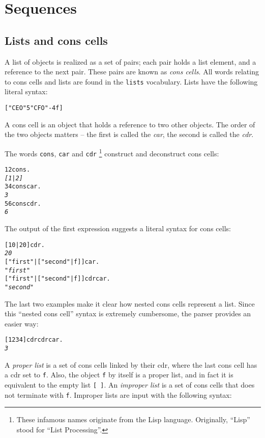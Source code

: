 \documentclass[english]{article}
\begin{document}
\section{Sequences}

\subsection{Lists and cons cells}

A list of objects is realized as a set of pairs; each pair holds a list element,
and a reference to the next pair. These pairs are known as \emph{cons cells}. All words relating to cons cells and lists are found in the \texttt{lists}
vocabulary. Lists have the following literal
syntax:

\begin{alltt}
{[} "CEO" 5 "CFO" -4 f {]}
\end{alltt}

A cons cell is an object that holds a reference to two other objects.
The order of the two objects matters -- the first is called the \emph{car},
the second is called the \emph{cdr}.

The words \texttt{cons}, \texttt{car} and \texttt{cdr}%
\footnote{These infamous names originate from the Lisp language. Originally,
{}``Lisp'' stood for {}``List Processing''.%
} construct and deconstruct cons cells:

\begin{alltt}
1 2 cons .
\emph{{[} 1 | 2 {]}}
3 4 cons car .
\emph{3}
5 6 cons cdr .
\emph{6}
\end{alltt}
The output of the first expression suggests a literal syntax for cons
cells:

\begin{alltt}
{[} 10 | 20 {]} cdr .
\emph{20}
{[} "first" | {[} "second" | f {]} {]} car .
\emph{"first"}
{[} "first" | {[} "second" | f {]} {]} cdr car .
\emph{"second"}
\end{alltt}
The last two examples make it clear how nested cons cells represent
a list. Since this {}``nested cons cell'' syntax is extremely cumbersome,
the parser provides an easier way:

\begin{alltt}
{[} 1 2 3 4 {]} cdr cdr car .
\emph{3}
\end{alltt}

A \emph{proper list} is a set of cons cells linked by their cdr, where the last cons cell has a cdr set to \texttt{f}. Also, the object \texttt{f} by itself
is a proper list, and in fact it is equivalent to the empty list \texttt{{[}
{]}}. An \emph{improper list} is a set of cons cells that does not terminate with \texttt{f}. Improper lists are input with the following syntax:
\end{document}
